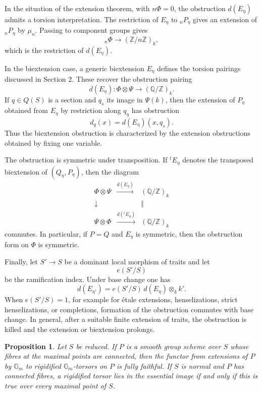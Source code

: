 \documentclass[11pt]{article}
\newtheorem{proposition}{Proposition}[section]
\newcommand{\bZ}{\mathbb Z}
\newcommand{\bQ}{\mathbb Q}
\newcommand{\Gm}{\mathbb G_m}
\begin{document}
In the situation of the extension theorem, with \(n\Phi=0\), the obstruction
\(d(E_\eta)\) admits a torsion interpretation. The restriction of \(E_\eta\) to
\({}_nP_\eta\) gives an extension of \({}_nP_\eta\) by \(\mu_n\). Passing to
component groups gives
\[
{}_n\Phi\longrightarrow (\bZ/n\bZ)_k,
\]
which is the restriction of \(d(E_\eta)\).

In the biextension case, a generic biextension \(E_\eta\) defines the torsion
pairings discussed in Section 2. These recover the obstruction pairing
\[
d(E_\eta):\Phi\otimes\Psi\to(\bQ/\bZ)_k.
\]
If \(q\in Q(S)\) is a section and \(q_s\) its image in \(\Psi(k)\), then the
extension of \(P_\eta\) obtained from \(E_\eta\) by restriction along \(q_\eta\)
has obstruction
\[
d_q(x)=d(E_\eta)(x,q_s).
\]
Thus the biextension obstruction is characterized by the extension obstructions
obtained by fixing one variable.

The obstruction is symmetric under transposition. If \({}^tE_\eta\) denotes the
transposed biextension of \((Q_\eta,P_\eta)\), then the diagram
\[
\begin{array}{ccc}
\Phi\otimes\Psi & \xrightarrow{d(E_\eta)} & (\bQ/\bZ)_k\\
\downarrow & & \Vert\\
\Psi\otimes\Phi & \xrightarrow{d({}^tE_\eta)} & (\bQ/\bZ)_k
\end{array}
\]
commutes. In particular, if \(P=Q\) and \(E_\eta\) is symmetric, then the
obstruction form on \(\Phi\) is symmetric.

Finally, let \(S'\to S\) be a dominant local morphism of traits and let
\[
e(S'/S)
\]
be the ramification index. Under base change one has
\[
d(E_{\eta'})=e(S'/S)\, d(E_\eta)\otimes_k k'.
\]
When \(e(S'/S)=1\), for example for étale extensions, henselizations, strict
henselizations, or completions, formation of the obstruction commutes with base
change. In general, after a suitable finite extension of traits, the obstruction
is killed and the extension or biextension prolongs.

\begin{proposition}
Let \(S\) be reduced. If \(P\) is a smooth group scheme over \(S\) whose fibres
at the maximal points are connected, then the functor from extensions of \(P\)
by \(\Gm\) to rigidified \(\Gm\)-torsors on \(P\) is fully faithful. If \(S\) is
normal and \(P\) has connected fibres, a rigidified torsor lies in the essential
image if and only if this is true over every maximal point of \(S\).
\end{proposition}
\end{document}
